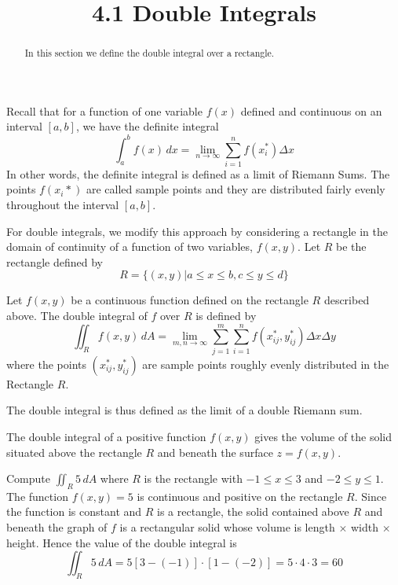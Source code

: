 \documentclass[handout]{ximera}
\title{4.1 Double Integrals}
\begin{document}
\begin{abstract}
In this section we define the double integral over a rectangle.
\end{abstract}
 
\maketitle


Recall that for a function of one variable $f(x)$ defined and continuous on an interval $[a,b]$, we have the definite integral
\[
\int_a^b f(x) \, dx = \lim_{n \to \infty} \sum_{i = 1}^n f(x_i^*) \Delta x
\]
In other words, the definite integral is defined as a limit of Riemann Sums.  The points $f(x_i*)$ are called sample points and they are 
distributed fairly evenly throughout the interval $[a,b]$.

For double integrals, we modify this approach by considering a rectangle in the domain of continuity of a function of two variables, $f(x,y)$.
Let $R$ be the rectangle defined by
\[
R = \{(x,y) | a\leq x \leq b, c\leq y \leq d\}
\]

\begin{definition}
Let $f(x,y)$ be a continuous function defined on the rectangle $R$ described above. The double integral of $f$ over $R$ is defined by
\[
\iint_R f(x,y) \, dA = \lim_{m, n \to \infty} \sum_{j = 1}^m\sum_{i = 1}^n f(x_{ij}^*, y_{ij}^*) \Delta x \Delta y
\]
where the points $(x_{ij}^*, y_{ij}^*)$ are sample points roughly evenly distributed in the Rectangle $R$.
\end{definition}

The double integral is thus defined as the limit of a double Riemann sum.

\begin{remark}
The double integral of a positive function $f(x,y)$ gives the volume of the solid situated above the rectangle $R$ and beneath the surface $z = f(x,y)$.
\end{remark}


\begin{example}[Example 1]
Compute $\iint_R 5 \, dA$ where $R$ is the rectangle with $-1 \leq x \leq 3$ and $-2 \leq y \leq 1$.\\
The function $f(x,y) = 5$ is continuous and positive on the rectangle $R$.  Since the function is constant and $R$ is a rectangle, the solid contained above $R$
and beneath the graph of $f$ is a rectangular solid whose volume is length $\times$ width $\times$ height.
Hence the value of the double integral is
\[
\iint_R 5 \, dA = 5[3-(-1)] \cdot [1-(-2)] = 5 \cdot 4 \cdot 3 = 60
\]
\end{example}
\end{document}
